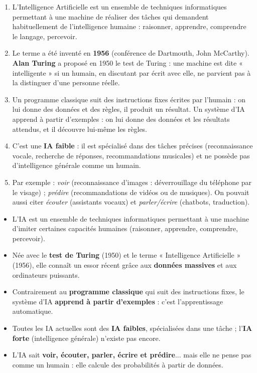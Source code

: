 \documentclass[11pt]{article}
\newcommand{\cle}[1]{{\popxbold\color{popdark}#1}}
\begin{document}
\begin{corrige}
\begin{enumerate}
\item L'Intelligence Artificielle est un ensemble de techniques informatiques permettant à une machine de réaliser des tâches qui demandent habituellement de l'intelligence humaine : raisonner, apprendre, comprendre le langage, percevoir.
\item Le terme a été inventé en \textbf{1956} (conférence de Dartmouth, John McCarthy). \textbf{Alan Turing} a proposé en 1950 le test de Turing : une machine est dite « intelligente » si un humain, en discutant par écrit avec elle, ne parvient pas à la distinguer d'une personne réelle.
\item Un programme classique suit des instructions fixes écrites par l'humain : on lui donne des données et des règles, il produit un résultat. Un système d'IA apprend à partir d'exemples : on lui donne des données et les résultats attendus, et il découvre lui-même les règles.
\item C'est une \textbf{IA faible} : il est spécialisé dans des tâches précises (reconnaissance vocale, recherche de réponses, recommandations musicales) et ne possède pas d'intelligence générale comme un humain.
\item Par exemple : \emph{voir} (reconnaissance d'images : déverrouillage du téléphone par le visage) ; \emph{prédire} (recommandations de vidéos ou de musiques). On pouvait aussi citer \emph{écouter} (assistants vocaux) et \emph{parler/écrire} (chatbots, traduction).
\end{enumerate}
\end{corrige}

\begin{aretenir}
\begin{itemize}
\item L'\cle{IA} est un ensemble de techniques informatiques permettant à une machine d'imiter certaines capacités humaines (raisonner, apprendre, comprendre, percevoir).
\item Née avec le \textbf{test de Turing} (1950) et le terme « Intelligence Artificielle » (1956), elle connaît un essor récent grâce aux \textbf{données massives} et aux ordinateurs puissants.
\item Contrairement au \textbf{programme classique} qui suit des instructions fixes, le système d'IA \textbf{apprend à partir d'exemples} : c'est l'\cle{apprentissage automatique}.
\item Toutes les IA actuelles sont des \textbf{IA faibles}, spécialisées dans une tâche ; l'\textbf{IA forte} (intelligence générale) n'existe pas encore.
\item L'IA sait \textbf{voir, écouter, parler, écrire et prédire}... mais elle ne pense pas comme un humain : elle calcule des probabilités à partir de données.
\end{itemize}
\end{aretenir}
\end{document}

